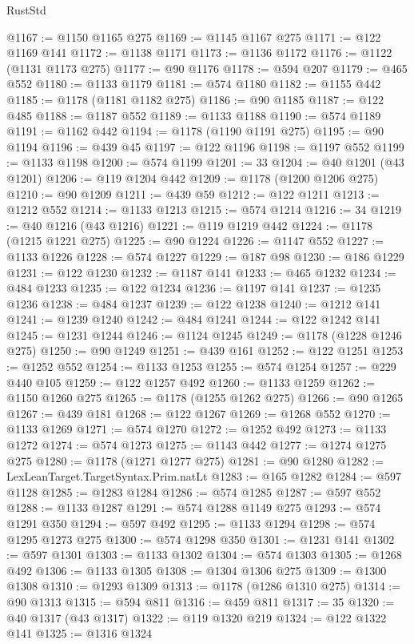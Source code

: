 \begin{lexlean}{RustStd}
\begin{coremodule}
@1167 := @1150 @1165 @275
@1169 := @1145 @1167 @275
@1171 := @122 @1169 @141
@1172 := @1138 @1171
@1173 := @1136 @1172
@1176 := @1122 (@1131 @1173 @275)
@1177 := @90 @1176
@1178 := @594 @207
@1179 := @465 @552
@1180 := @1133 @1179
@1181 := @574 @1180
@1182 := @1155 @442
@1185 := @1178 (@1181 @1182 @275)
@1186 := @90 @1185
@1187 := @122 @485
@1188 := @1187 @552
@1189 := @1133 @1188
@1190 := @574 @1189
@1191 := @1162 @442
@1194 := @1178 (@1190 @1191 @275)
@1195 := @90 @1194
@1196 := @439 @45
@1197 := @122 @1196
@1198 := @1197 @552
@1199 := @1133 @1198
@1200 := @574 @1199
@1201 := 33
@1204 := @40 @1201 (@43 @1201)
@1206 := @119 @1204 @442
@1209 := @1178 (@1200 @1206 @275)
@1210 := @90 @1209
@1211 := @439 @59
@1212 := @122 @1211
@1213 := @1212 @552
@1214 := @1133 @1213
@1215 := @574 @1214
@1216 := 34
@1219 := @40 @1216 (@43 @1216)
@1221 := @119 @1219 @442
@1224 := @1178 (@1215 @1221 @275)
@1225 := @90 @1224
@1226 := @1147 @552
@1227 := @1133 @1226
@1228 := @574 @1227
@1229 := @187 @98
@1230 := @186 @1229
@1231 := @122 @1230
@1232 := @1187 @141
@1233 := @465 @1232
@1234 := @484 @1233
@1235 := @122 @1234
@1236 := @1197 @141
@1237 := @1235 @1236
@1238 := @484 @1237
@1239 := @122 @1238
@1240 := @1212 @141
@1241 := @1239 @1240
@1242 := @484 @1241
@1244 := @122 @1242 @141
@1245 := @1231 @1244
@1246 := @1124 @1245
@1249 := @1178 (@1228 @1246 @275)
@1250 := @90 @1249
@1251 := @439 @161
@1252 := @122 @1251
@1253 := @1252 @552
@1254 := @1133 @1253
@1255 := @574 @1254
@1257 := @229 @440 @105
@1259 := @122 @1257 @492
@1260 := @1133 @1259
@1262 := @1150 @1260 @275
@1265 := @1178 (@1255 @1262 @275)
@1266 := @90 @1265
@1267 := @439 @181
@1268 := @122 @1267
@1269 := @1268 @552
@1270 := @1133 @1269
@1271 := @574 @1270
@1272 := @1252 @492
@1273 := @1133 @1272
@1274 := @574 @1273
@1275 := @1143 @442
@1277 := @1274 @1275 @275
@1280 := @1178 (@1271 @1277 @275)
@1281 := @90 @1280
@1282 := LexLeanTarget.TargetSyntax.Prim.natLt
@1283 := @165 @1282
@1284 := @597 @1128
@1285 := @1283 @1284
@1286 := @574 @1285
@1287 := @597 @552
@1288 := @1133 @1287
@1291 := @574 @1288 @1149 @275
@1293 := @574 @1291 @350
@1294 := @597 @492
@1295 := @1133 @1294
@1298 := @574 @1295 @1273 @275
@1300 := @574 @1298 @350
@1301 := @1231 @141
@1302 := @597 @1301
@1303 := @1133 @1302
@1304 := @574 @1303
@1305 := @1268 @492
@1306 := @1133 @1305
@1308 := @1304 @1306 @275
@1309 := @1300 @1308
@1310 := @1293 @1309
@1313 := @1178 (@1286 @1310 @275)
@1314 := @90 @1313
@1315 := @594 @811
@1316 := @459 @811
@1317 := 35
@1320 := @40 @1317 (@43 @1317)
@1322 := @119 @1320 @219
@1324 := @122 @1322 @141
@1325 := @1316 @1324

\end{coremodule}
\end{lexlean}
